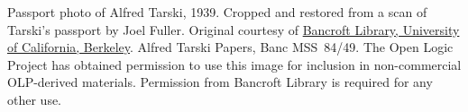 Passport photo of Alfred Tarski, 1939. Cropped and restored from a
scan of Tarski's passport by Joel Fuller. Original courtesy of
\href{http://www.lib.berkeley.edu/libraries/bancroft-library}{Bancroft
  Library, University of California, Berkeley}. Alfred Tarski Papers,
Banc MSS~84/49. The Open Logic Project has obtained permission to use
this image for inclusion in non-commercial OLP-derived
materials. Permission from Bancroft Library is required for any other
use.
